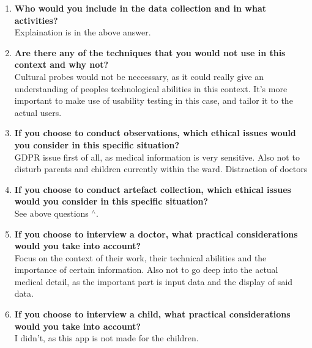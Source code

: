 \begin{enumerate}
    \item \textbf{Who would you include in the data collection and in what activities?}\\
    Explaination is in the above answer.
    \item \textbf{Are there any of the techniques that you would not use in this context and why not?}\\
    Cultural probes would not be neccessary, as it could really give an understanding of peoples technological abilities in this context. It's more important to make use of usability testing in this case, and tailor it to the actual users.
    \item \textbf{If you choose to conduct observations, which ethical issues would you consider in this specific situation?}\\
    GDPR issue first of all, as medical information is very sensitive. Also not to disturb parents and children currently within the ward. Distraction of doctors
    \item \textbf{If you choose to conduct artefact collection, which ethical issues would you consider in this specific situation?}\\
    See above questions $^\wedge$.
    \item \textbf{If you choose to interview a doctor, what practical considerations would you take into account?}\\
    Focus on the context of their work, their technical abilities and the importance of certain information. Also not to go deep into the actual medical detail, as the important part is input data and the display of said data.
    \item \textbf{If you choose to interview a child, what practical considerations would you take into account? }\\
    I didn't, as this app is not made for the children.
\end{enumerate}